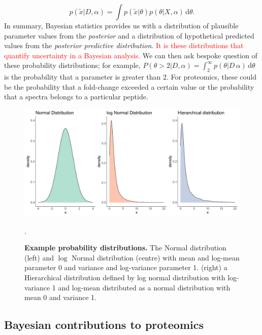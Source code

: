 \documentclass[12pt,english, journal=jpr, layout=twocolumn]{article}
\begin{document}
\begin{equation}
p(\tilde{x}|D,\alpha) = \int p(\tilde{x}|\theta)p(\theta|X,\alpha)\,\text{d}\theta.
\end{equation}
In summary, Bayesian statistics provides us with a distribution of plausible parameter values from the \textit{posterior} and a distribution of hypothetical predicted values from the \textit{posterior predictive distribution}. \textcolor{red}{It is these distributions that quantify uncertainty in a Bayesian analysis.} We can then ask bespoke question of these probability distributions; for example, $P(\theta > 2|D, \alpha) = \int_{2}^{\infty}p(\theta|D\,\alpha)\,\text{d}\theta$ is the probability that a parameter is greater than $2$. For proteomics, these could be the probability that a fold-change exceeded a certain value or the probability that a spectra belongs to a particular peptide. 
\begin{figure}[H]
	\centering
	\includegraphics[width =1\textwidth]{figure1distribution.pdf}
	\caption{\textbf{Example probability distributions.} The Normal distribution (left) and $\log$ Normal distribution (centre) with mean and log-mean parameter 0 and variance and log-variance parameter 1. (right) a Hierarchical distribution defined by log normal distribution with log-variance 1 and log-mean distributed as a normal distribution with mean 0 and variance 1.}.
	\label{figure::figure1dist}
\end{figure}

\subsection{Bayesian contributions to proteomics}
\end{document}
